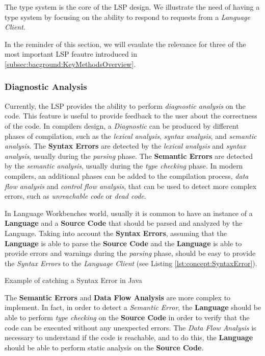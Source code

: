 The type system is the core of the LSP design. We illustrate the need of having a type system by focusing on the ability to respond to requests from a \textit{Language Client}.

In the reminder of this section, we will evaulate the relevance for three of the most important LSP feautre introduced in \ref{subsec:bacground:KeyMethodsOverview}.

\subsubsection{Diagnostic Analysis}\label{subsubsec:concept:DiagnosticAnalysis}

Currently, the LSP provides the ability to perform \textit{diagnostic analysis} on the code. This feature is useful to provide feedback to the user about the correctness of the code.
In compilers design, a \textit{Diagnostic} can be produced by different phases of compilation, such as the \textit{lexical analysis}, \textit{syntax analysis}, and \textit{semantic analysis}.
The \textbf{Syntax Errors} are detected by the \textit{lexical analysis} and \textit{syntax analysis}, usually during the \textit{parsing} phase. The \textbf{Semantic Errors} are detected by the \textit{semantic analysis}, usually during the \textit{type checking} phase.
In modern compilers, an additional phases can be added to the compilation process, \textit{data flow analysis} and \textit{control flow analysis}, that can be used to detect more complex errors, such as \textit{unreachable code} or \textit{dead code}.

In Language Workbenches world, usually it is common to have an instance of a \textbf{Language} and a \textbf{Source Code} that should be parsed and analyzed by the Language.
Taking into account the \textbf{Syntax Errors}, assuming that the \textbf{Language} is able to parse the \textbf{Source Code} and the \textbf{Language} is able to provide errors and warnings during the \textit{parsing} phase, should be easy to provide the \textit{Syntax Errors} to the \textit{Language Client} (see Listing \ref{lst:concept:SyntaxError}).

\begin{Listing}[t]
    \centering
    \caption{Example of catching a Syntax Error in Java}
    \label{lst:concept:SyntaxError}
\end{Listing}

The \textbf{Semantic Errors} and \textbf{Data Flow Analysis} are more complex to implement. In fact, in order to detect a \textit{Semantic Error}, the \textbf{Language} should be able to perform \textit{type checking} on the \textbf{Source Code} in order to verify that the code can be executed without any unexpected errors. The \textit{Data Flow Analysis} is necessary to understand if the code is reachable, and to do this, the \textbf{Language} should be able to perform static analysis on the \textbf{Source Code}.

